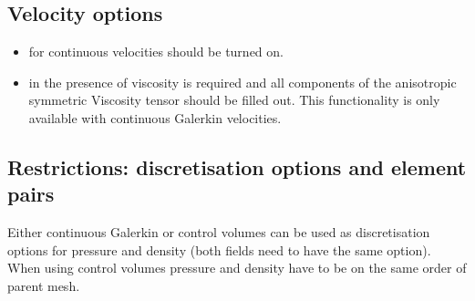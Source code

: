 \subsection{Velocity options}
\begin{itemize}
\item for continuous velocities  should be turned on.
\item in the presence of viscosity  is required and all components of the anisotropic symmetric Viscosity tensor should be filled out.  This functionality is only available with continuous Galerkin velocities.
\end{itemize}

\subsection{Restrictions: discretisation options and element pairs}
Either continuous Galerkin or control volumes can be used as discretisation options for pressure and density (both fields need to have the same option). When using control volumes pressure and density have to be on the same order of parent mesh.

